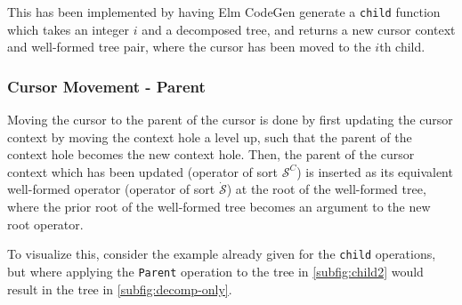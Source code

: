 \documentclass[sigplan,screen]{acmart}
\begin{document}
This has been implemented by having Elm CodeGen generate a \texttt{child} function which
takes an integer $i$ and a decomposed tree, and returns a new cursor context
and well-formed tree pair, where the cursor has been moved to the $i$th child.

\subsubsection{Cursor Movement - Parent}

Moving the cursor to the parent of the cursor is done by first updating the cursor context
by moving the context hole a level up, such that the parent of the context hole
becomes the new context hole. Then, the parent of the cursor context which has
been updated (operator of sort $\mathcal{S}^C$) is inserted as its equivalent
well-formed operator (operator of sort $\dot{\mathcal{S}}$) at the root of the
well-formed tree, where the prior root of the well-formed tree becomes an argument to the new root operator.

To visualize this, consider the example already given for the \texttt{child} operations, but where applying the \texttt{Parent} operation to the tree in \cref{subfig:child2} would result in the tree in \cref{subfig:decomp-only}.
\end{document}

